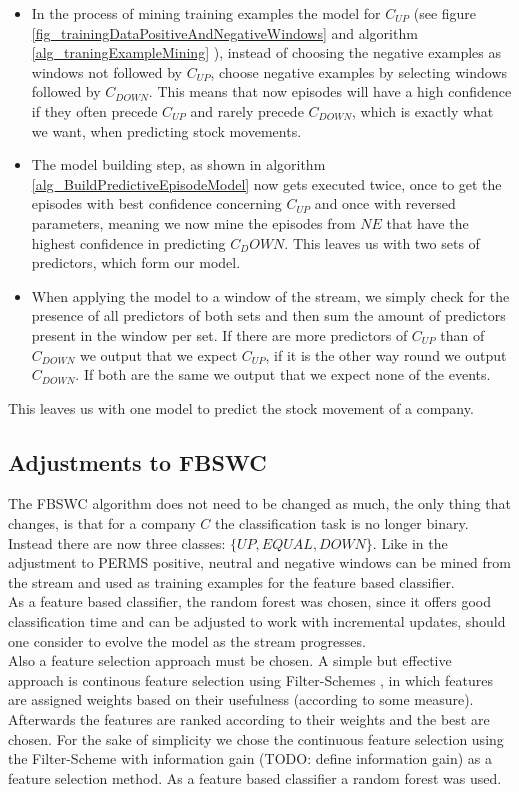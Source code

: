 \begin{itemize}
	\item In the process of mining training examples the model for $C_{UP}$ (see figure \ref{fig_trainingDataPositiveAndNegativeWindows} and algorithm \ref{alg_traningExampleMining} ), instead of choosing the negative examples as windows not followed by $C_{UP}$, choose negative examples by selecting windows followed by $C_{DOWN}$. This means that now episodes will have a high confidence if they often precede $C_{UP}$ and rarely precede $C_{DOWN}$, which is exactly what we want, when predicting stock movements.
	\item The model building step, as shown in algorithm \ref{alg_BuildPredictiveEpisodeModel} now gets executed twice, once to get the episodes with best confidence concerning $C_{UP}$ and once with reversed parameters, meaning we now mine the episodes from $NE$ that have the highest confidence in predicting $C_DOWN$. This leaves us with two sets of predictors, which form our model.
	\item When applying the model to a window of the stream, we simply check for the presence of all predictors of both sets and then sum the amount of predictors present in the window per set. If there are more predictors of $C_{UP}$ than of $C_{DOWN}$ we output that we expect $C_{UP}$, if it is the other way round we output $C_{DOWN}$. If both are the same we output that we expect none of the events.
\end{itemize}

This leaves us with one model to predict the stock movement of a company.

\subsection{Adjustments to FBSWC}
The FBSWC algorithm does not need to be changed as much, the only thing that changes, is that for a company $C$ the classification task is no longer binary. Instead there are now three classes: $\{UP,EQUAL,DOWN\}$. Like in the adjustment to PERMS positive, neutral and negative windows can be mined from the stream and used as training examples for the feature based classifier. \\
As a feature based classifier, the random forest was chosen, since it offers good classification time and can be adjusted to work with incremental updates, should one consider to evolve the model as the stream progresses.\\
Also a feature selection approach must be chosen. A simple but effective approach is continous feature selection using Filter-Schemes \cite{molina2002feature}, in which features are assigned weights based on their usefulness (according to some measure). Afterwards the features are ranked according to their weights and the best are chosen. For the sake of simplicity we chose the continuous feature selection using the Filter-Scheme with information gain (TODO: define information gain) as a feature selection method. As a feature based classifier a random forest was used.

